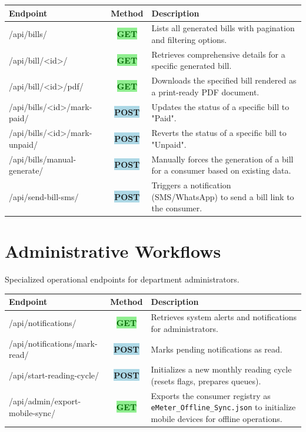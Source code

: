 \documentclass[12pt, a4paper]{report}
\newcommand{\httpget}{\colorbox{lightGreen}{\textcolor{darkGreen}{\textbf{\small GET}}}}
\newcommand{\httppost}{\colorbox{lightBlue}{\textcolor{deepBlue}{\textbf{\small POST}}}}
\begin{document}
\begin{table}[H]
\centering
\begin{tabularx}{\textwidth}{>{\ttfamily\raggedright\arraybackslash}p{} c X}
\toprule
\textbf{Endpoint} & \textbf{Method} & \textbf{Description} \\
\midrule
/api/bills/ & \httpget & Lists all generated bills with pagination and filtering options. \\
/api/bill/<id>/ & \httpget & Retrieves comprehensive details for a specific generated bill. \\
/api/bill/<id>/pdf/ & \httpget & Downloads the specified bill rendered as a print-ready PDF document. \\
/api/bills/<id>/mark-paid/ & \httppost & Updates the status of a specific bill to "Paid". \\
/api/bills/<id>/mark-unpaid/ & \httppost & Reverts the status of a specific bill to "Unpaid". \\
/api/bills/manual-generate/ & \httppost & Manually forces the generation of a bill for a consumer based on existing data. \\
/api/send-bill-sms/ & \httppost & Triggers a notification (SMS/WhatsApp) to send a bill link to the consumer. \\
\bottomrule
\end{tabularx}
\end{table}

\section{Administrative Workflows}
Specialized operational endpoints for department administrators.

\begin{table}[H]
\centering
\begin{tabularx}{\textwidth}{>{\ttfamily\raggedright\arraybackslash}p{} c X}
\toprule
\textbf{Endpoint} & \textbf{Method} & \textbf{Description} \\
\midrule
/api/notifications/ & \httpget & Retrieves system alerts and notifications for administrators. \\
/api/notifications/mark-read/ & \httppost & Marks pending notifications as read. \\
/api/start-reading-cycle/ & \httppost & Initializes a new monthly reading cycle (resets flags, prepares queues). \\
/api/admin/export-mobile-sync/ & \httpget & Exports the consumer registry as \texttt{eMeter\_Offline\_Sync.json} to initialize mobile devices for offline operations. \\
\bottomrule
\end{tabularx}
\end{table}
\end{document}
